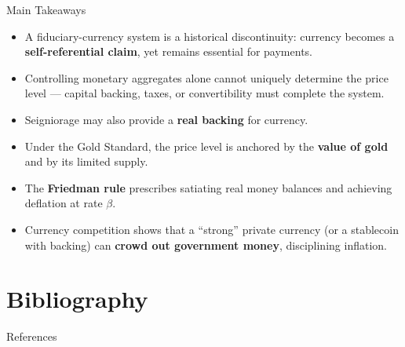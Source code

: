 \documentclass[11pt,aspectratio=169]{beamer}
\begin{document}
\begin{frame}{Main Takeaways}
\small
\begin{itemize}

    \item A fiduciary-currency system is a historical discontinuity: currency becomes a \textbf{self-referential claim}, yet remains essential for payments.

    \vspace{0.2em}

    \item Controlling monetary aggregates alone cannot uniquely determine the price level — capital backing, taxes, or convertibility must complete the system.
    
\vspace{0.2em}

    \item Seigniorage may also provide a \textbf{real backing} for currency.

    \vspace{0.2em}

    \item Under the Gold Standard, the price level is anchored by the \textbf{value of gold} and by its limited supply.

    \vspace{0.2em}

    \item The \textbf{Friedman rule} prescribes satiating real money balances and achieving deflation at rate $\beta$.

    \vspace{0.2em}

    \item Currency competition shows that a “strong” private currency (or a stablecoin with backing) can \textbf{crowd out government money}, disciplining inflation.

\end{itemize}
\end{frame}


\section{Bibliography}

\begin{frame}{References}
\printbibliography
\end{frame}
\end{document}
